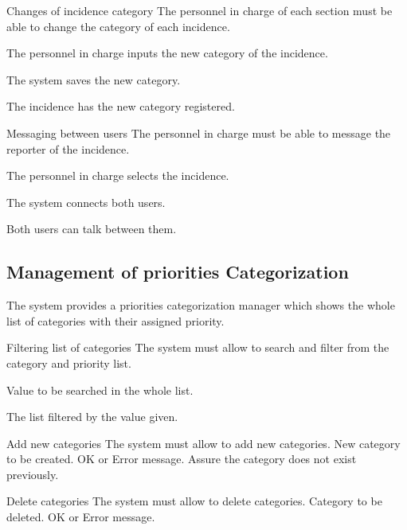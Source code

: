 \begin{requirement}{Changes of incidence category}
\reqdesc The personnel in charge of each section must be able to change the category of each incidence.

\reqin The personnel in charge inputs the new category of the incidence.

\reqsteps The system saves the new category.

\reqout The incidence has the new category registered.
\end{requirement}


\begin{requirement}{Messaging between users}
\reqdesc The personnel in charge must be able to message the reporter of the incidence.

\reqin The personnel in charge selects the incidence.

\reqsteps The system connects both users.

\reqout Both users can talk between them.
\end{requirement}




\subsection{Management of priorities Categorization}

The system provides a priorities categorization manager which shows the whole list of categories with their assigned priority. 

\begin{requirement}{Filtering list of categories}
\reqdesc The system must allow to search and filter from the category and priority list.

\reqin Value to be searched in the whole list.

\reqout The list filtered by the value given.
\end{requirement}

\begin{requirement}{Add new categories}
\reqdesc  The system must allow to add new categories.
\reqin New category to be created.
\reqout OK or Error message.
\reqsteps Assure the category does not exist previously.
\end{requirement}

\begin{requirement}{Delete categories}
\reqdesc  The system must allow to delete categories.
\reqin Category to be deleted.
\reqout OK or Error message.
\end{requirement}


